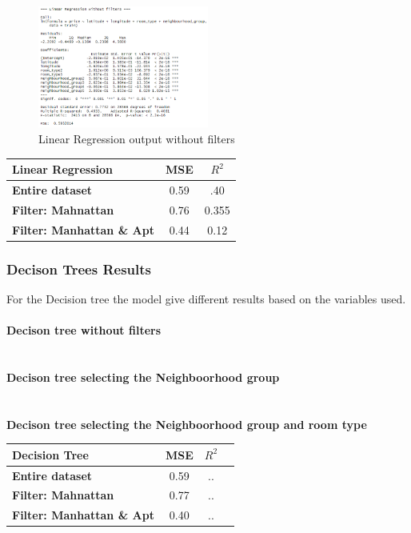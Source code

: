 \documentclass{FR16}
\begin{document}
\begin{figure}[H]
\centering
\includegraphics[width=0.5\textwidth]{figures/lm1.PNG} 
\caption{\label{fig:8} Linear Regression output without filters }
\end{figure}



\begin{center}
\begin{tabular}{l  c c }
\arrayrulecolor{Azzurro}
\hline
{\bfseries Linear Regression
} & MSE & $R^2$  \\
\hline
{\bfseries Entire dataset} & 0.59 & .40  \\
{\bfseries Filter: Mahnattan} & 0.76 & 0.355  \\
{\bfseries Filter: Manhattan \& Apt} & 0.44 &  0.12  \\
\hline
\end{tabular}
\end{center}


\subsubsection{Decison Trees Results}
For the Decision tree the model give different results based on the variables used.
\\\\ \textbf{Decison tree  without filters}\\
\\\\
\textbf{Decison tree selecting the Neighboorhood group}\\
\\\\ 
\textbf{Decison tree  selecting the Neighboorhood group and room type}



\begin{center}
\begin{tabular}{l c c c }
\arrayrulecolor{Azzurro}
\hline
{\bfseries Decision Tree
} & MSE & $R^2$  \\
\hline
{\bfseries Entire dataset} & 0.59 & ..  \\
{\bfseries Filter: Mahnattan} & 0.77 & ..  \\
{\bfseries Filter: Manhattan \& Apt} &  0.40 & ..  \\
\hline
\end{tabular}
\end{center}
\end{document}
